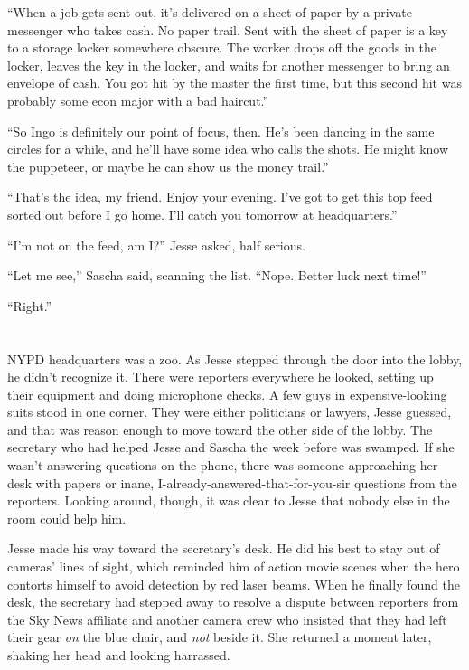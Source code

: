 \documentclass[12pt]{book}
\begin{document}
``When a job gets sent out, it's delivered on a sheet of paper by a private messenger who takes cash.  No paper trail.  Sent with the sheet of paper is a key to a storage locker somewhere obscure.  The worker drops off the goods in the locker, leaves the key in the locker, and waits for another messenger to bring an envelope of cash.  You got hit by the master the first time, but this second hit was probably some econ major with a bad haircut.''

``So Ingo is definitely our point of focus, then.  He's been dancing in the same circles for a while, and he'll have some idea who calls the shots.  He might know the puppeteer, or maybe he can show us the money trail.''

``That's the idea, my friend.  Enjoy your evening.  I've got to get this top feed sorted out before I go home.  I'll catch you tomorrow at headquarters.''

``I'm not on the feed, am I?'' Jesse asked, half serious.

``Let me see,'' Sascha said, scanning the list.  ``Nope.  Better luck next time!''

``Right.''

\chapter{}
										
NYPD headquarters was a zoo.  As Jesse stepped through the door into the lobby, he didn't recognize it.  There were reporters everywhere he looked, setting up their equipment and doing microphone checks.  A few guys in expensive-looking suits stood in one corner.  They were either politicians or lawyers, Jesse guessed, and that was reason enough to move toward the other side of the lobby.  The secretary who had helped Jesse and Sascha the week before was swamped.  If she wasn't answering questions on the phone, there was someone approaching her desk with papers or inane, I-already-answered-that-for-you-sir questions from the reporters.  Looking around, though, it was clear to Jesse that nobody else in the room could help him.

Jesse made his way toward the secretary's desk.  He did his best to stay out of cameras' lines of sight, which reminded him of action movie scenes when the hero contorts himself to avoid detection by red laser beams.  When he finally found the desk, the secretary had stepped away to resolve a dispute between reporters from the Sky News affiliate and another camera crew who insisted that they had left their gear \emph{on} the blue chair, and \emph{not} beside it.  She returned a moment later, shaking her head and looking harrassed.
\end{document}
